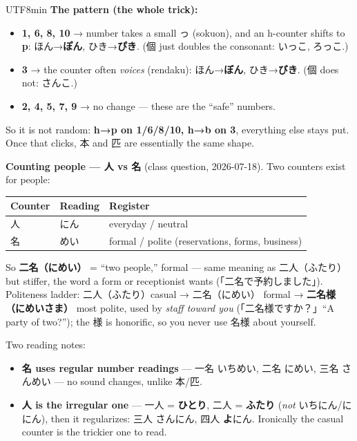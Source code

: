 \documentclass[11pt]{article}
\begin{document}
\begin{CJK}{UTF8}{min}
\textbf{The pattern (the whole trick):}
\begin{itemize}
  \item \textbf{1, 6, 8, 10} → number takes a small っ (sokuon), and an h-counter
        shifts to \textbf{p}: ほん→\textbf{ぽん}, ひき→\textbf{ぴき}. (個 just
        doubles the consonant: いっこ, ろっこ.)
  \item \textbf{3} → the counter often \emph{voices} (rendaku): ほん→\textbf{ぼん},
        ひき→\textbf{びき}. (個 does not: さんこ.)
  \item \textbf{2, 4, 5, 7, 9} → no change --- these are the ``safe'' numbers.
\end{itemize}
So it is not random: \textbf{h→p on 1/6/8/10, h→b on 3}, everything else stays
put. Once that clicks, 本 and 匹 are essentially the same shape.

\textbf{Counting people --- \texorpdfstring{人}{nin} vs \texorpdfstring{名}{mei}}
(class question, 2026-07-18). Two counters exist for people:
\begin{center}
\begin{tabular}{@{}lll@{}}
\toprule
Counter & Reading & Register \\
\midrule
人 & にん & everyday / neutral \\
名 & めい & formal / polite (reservations, forms, business) \\
\bottomrule
\end{tabular}
\end{center}
So \textbf{二名（にめい）} = ``two people,'' formal --- same meaning as
二人（ふたり）but stiffer, the word a form or receptionist wants
(「二名で予約しました」). Politeness ladder: 二人（ふたり）casual → 二名（にめい）
formal → \textbf{二名様（にめいさま）} most polite, used by \emph{staff toward
you} (「二名様ですか？」``A party of two?''); the 様 is honorific, so you never
use 名様 about yourself.

Two reading notes:
\begin{itemize}
  \item \textbf{名 uses regular number readings} --- 一名 いちめい, 二名 にめい,
        三名 さんめい --- no sound changes, unlike 本/匹.
  \item \textbf{人 is the irregular one} --- 一人 = \textbf{ひとり}, 二人 =
        \textbf{ふたり} (\emph{not} いちにん/ににん), then it regularizes: 三人
        さんにん, 四人 \textbf{よ}にん. Ironically the casual counter is the
        trickier one to read.
\end{itemize}


\end{CJK}
\end{document}
